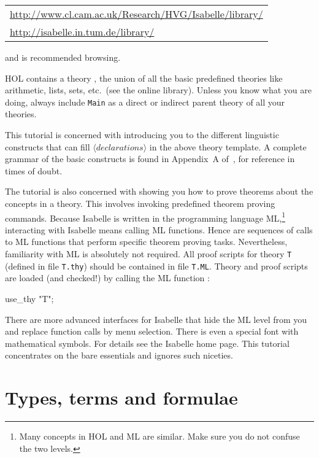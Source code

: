 \begin{center}\small
  \begin{tabular}{l}
    \url{http://www.cl.cam.ac.uk/Research/HVG/Isabelle/library/} \\
    \url{http://isabelle.in.tum.de/library/} \\
  \end{tabular}
\end{center}

and is recommended browsing.
\begin{warn}
  HOL contains a theory , the union of all the basic
  predefined theories like arithmetic, lists, sets, etc.\ (see the online
  library).  Unless you know what you are doing, always include \texttt{Main}
  as a direct or indirect parent theory of all your theories.
\end{warn}

This tutorial is concerned with introducing you to the different linguistic
constructs that can fill ${\langle}declarations{\rangle}$ in the above theory template.
A complete grammar of the basic constructs is found in Appendix~A
of~\cite{isabelle-ref}, for reference in times of doubt.

The tutorial is also concerned with showing you how to prove theorems about
the concepts in a theory. This involves invoking predefined theorem proving
commands. Because Isabelle is written in the programming language
ML,\footnote{Many concepts in HOL and ML are similar. Make sure you do not
  confuse the two levels.} interacting with Isabelle means calling ML
functions. Hence  are sequences of calls to ML
functions that perform specific theorem proving tasks. Nevertheless,
familiarity with ML is absolutely not required.  All proof scripts for theory
\texttt{T} (defined in file \texttt{T.thy}) should be contained in file
\texttt{T.ML}. Theory and proof scripts are loaded (and checked!) by calling
the ML function :
\begin{ttbox}
use_thy "T";
\end{ttbox}

There are more advanced interfaces for Isabelle that hide the ML level from
you and replace function calls by menu selection. There is even a special
font with mathematical symbols. For details see the Isabelle home page.  This
tutorial concentrates on the bare essentials and ignores such niceties.

\section{Types, terms and formulae}
\label{sec:TypesTermsForms}


